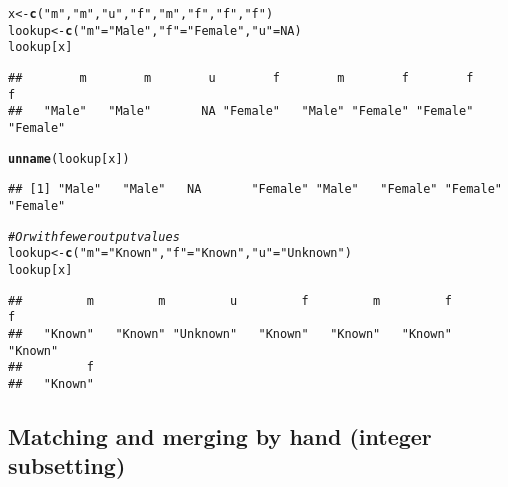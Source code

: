 \documentclass{article}\usepackage[]{graphicx}\usepackage[]{color}
\makeatletter
\newcommand{\hlnum}[1]{\textcolor[rgb]{0.686,0.059,0.569}{#1}}%
\newcommand{\hlstr}[1]{\textcolor[rgb]{0.192,0.494,0.8}{#1}}%
\newcommand{\hlcom}[1]{\textcolor[rgb]{0.678,0.584,0.686}{\textit{#1}}}%
\newcommand{\hlstd}[1]{\textcolor[rgb]{0.345,0.345,0.345}{#1}}%
\newcommand{\hlkwb}[1]{\textcolor[rgb]{0.69,0.353,0.396}{#1}}%
\newcommand{\hlkwd}[1]{\textcolor[rgb]{0.737,0.353,0.396}{\textbf{#1}}}%
\newenvironment{kframe}{%
 \def\at@end@of@kframe{}%
 \ifinner\ifhmode%
  \def\at@end@of@kframe{\end{minipage}}%
  \begin{minipage}{\columnwidth}%
 \fi\fi%
 \def\FrameCommand##1{\hskip\@totalleftmargin \hskip-\fboxsep
 \colorbox{shadecolor}{##1}\hskip-\fboxsep
     \hskip-\linewidth \hskip-\@totalleftmargin \hskip\columnwidth}%
 \MakeFramed {\advance\hsize-\width
   \@totalleftmargin\z@ \linewidth\hsize
   \@setminipage}}%
 {\par\unskip\endMakeFramed%
 \at@end@of@kframe}
\newenvironment{knitrout}{}{} %
\makeatother
\begin{document}
\begin{knitrout}
\color{fgcolor}\begin{kframe}
\begin{alltt}
\hlstd{x} \hlkwb{<-} \hlkwd{c}\hlstd{(}\hlstr{"m"}\hlstd{,} \hlstr{"m"}\hlstd{,} \hlstr{"u"}\hlstd{,} \hlstr{"f"}\hlstd{,} \hlstr{"m"}\hlstd{,} \hlstr{"f"}\hlstd{,} \hlstr{"f"}\hlstd{,} \hlstr{"f"}\hlstd{)}
\hlstd{lookup} \hlkwb{<-} \hlkwd{c}\hlstd{(}\hlstr{"m"}\hlstd{=}\hlstr{"Male"}\hlstd{,} \hlstr{"f"}\hlstd{=}\hlstr{"Female"}\hlstd{,} \hlstr{"u"}\hlstd{=}\hlnum{NA}\hlstd{)}
\hlstd{lookup[x]}
\end{alltt}
\begin{verbatim}
##        m        m        u        f        m        f        f        f 
##   "Male"   "Male"       NA "Female"   "Male" "Female" "Female" "Female"
\end{verbatim}
\begin{alltt}
\hlkwd{unname}\hlstd{(lookup[x])}
\end{alltt}
\begin{verbatim}
## [1] "Male"   "Male"   NA       "Female" "Male"   "Female" "Female" "Female"
\end{verbatim}
\begin{alltt}
\hlcom{# Or with fewer output values}
\hlstd{lookup} \hlkwb{<-} \hlkwd{c}\hlstd{(}\hlstr{"m"}\hlstd{=}\hlstr{"Known"}\hlstd{,} \hlstr{"f"}\hlstd{=}\hlstr{"Known"}\hlstd{,} \hlstr{"u"}\hlstd{=}\hlstr{"Unknown"}\hlstd{)}
\hlstd{lookup[x]}
\end{alltt}
\begin{verbatim}
##         m         m         u         f         m         f         f 
##   "Known"   "Known" "Unknown"   "Known"   "Known"   "Known"   "Known" 
##         f 
##   "Known"
\end{verbatim}
\end{kframe}
\end{knitrout}

\subsection{Matching and merging by hand (integer subsetting)}
\end{document}
